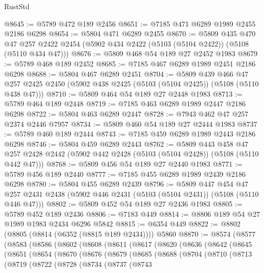 \begin{lexlean}{RustStd}
\begin{coremodule}
@8645 := @5789 @472 @189 @2456
@8651 := @7185 @471 @6289 @1989 @2455 @2186 @6298
@8654 := @5804 @471 @6289 @2455
@8670 := @5809
    @435
    @470
    @47
    @257
    @2422
    @2454
    (@5902 @434 @2422 (@5103 (@5104 @2422)) (@5108 (@5110 @434 @47)))
@8676 := @5809 @468 @54 @189 @27 @2452 @1983
@8679 := @5789 @468 @189 @2452
@8685 := @7185 @467 @6289 @1989 @2451 @2186 @6298
@8688 := @5804 @467 @6289 @2451
@8704 := @5809
    @439
    @466
    @47
    @257
    @2425
    @2450
    (@5902 @438 @2425 (@5103 (@5104 @2425)) (@5108 (@5110 @438 @47)))
@8710 := @5809 @464 @54 @189 @27 @2448 @1983
@8713 := @5789 @464 @189 @2448
@8719 := @7185 @463 @6289 @1989 @2447 @2186 @6298
@8722 := @5804 @463 @6289 @2447
@8728 := @7943 @462 @47 @257 @2374 @2446 @7957
@8734 := @5809 @460 @54 @189 @27 @2444 @1983
@8737 := @5789 @460 @189 @2444
@8743 := @7185 @459 @6289 @1989 @2443 @2186 @6298
@8746 := @5804 @459 @6289 @2443
@8762 := @5809
    @443
    @458
    @47
    @257
    @2428
    @2442
    (@5902 @442 @2428 (@5103 (@5104 @2428)) (@5108 (@5110 @442 @47)))
@8768 := @5809 @456 @54 @189 @27 @2440 @1983
@8771 := @5789 @456 @189 @2440
@8777 := @7185 @455 @6289 @1989 @2439 @2186 @6298
@8780 := @5804 @455 @6289 @2439
@8796 := @5809
    @447
    @454
    @47
    @257
    @2431
    @2438
    (@5902 @446 @2431 (@5103 (@5104 @2431)) (@5108 (@5110 @446 @47)))
@8802 := @5809 @452 @54 @189 @27 @2436 @1983
@8805 := @5789 @452 @189 @2436
@8806 := @7183 @449
@8814 := @8806 @189 @54 @27 @1989 @1983 @2434 @6296 @5842
@8815 := @6354 @449
@8822 := @8802 (@8805 (@8814 (@6352 (@8815 @189 @2434)))) @5860
@8870 := @8574
    (@8577
      (@8583
        (@8586
          (@8602
            (@8608
              (@8611
                (@8617
                  (@8620
                    (@8636
                      (@8642
                        (@8645
                          (@8651
                            (@8654
                              (@8670
                                (@8676
                                  (@8679
                                    (@8685
                                      (@8688
                                        (@8704
                                          (@8710
                                            (@8713
                                              (@8719
                                                (@8722
                                                  (@8728
                                                    (@8734
                                                      (@8737
                                                        (@8743

\end{coremodule}
\end{lexlean}
